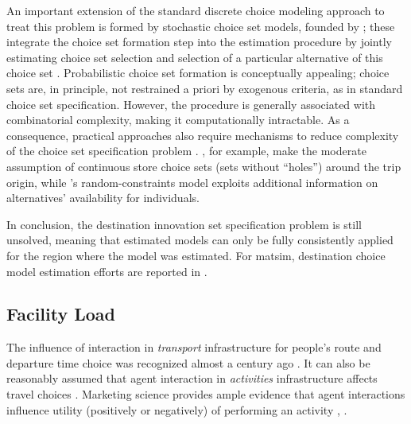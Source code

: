 An important extension of the standard discrete choice modeling approach to treat this problem is formed by stochastic choice set models, founded by \citet[][]{Manski_TD_1977, BurnettKPHanson_TRR_1979, BurnettKP_UG_1980}; these integrate the choice set formation step into the estimation procedure by jointly estimating  choice set selection and selection of a particular alternative of this choice set \citep[][]{Manski_TD_1977, BenAkivaBoccara_IJRM_1995}.
%
Probabilistic choice set formation is conceptually appealing; choice sets are, in principle, not restrained a priori by exogenous criteria, as in standard choice set specification. 
However, the procedure is generally associated with combinatorial complexity, making it computationally intractable. 
As a consequence, practical approaches also require mechanisms to reduce complexity of the choice set specification problem \citep[e.g.,][p.11]{BenAkivaBoccara_IJRM_1995}. 
\citet[][]{ZhengJieGuo_TRB_2008}, for example, make the moderate assumption of continuous store choice sets (\ie sets without ``holes'') around the trip origin, while \citet[][]{BenAkivaBoccara_IJRM_1995}'s random-constraints model exploits additional information on alternatives' availability for individuals.

In conclusion, the destination innovation set specification problem is still unsolved, meaning that estimated models can only be fully consistently applied for the region where the model was estimated. 
For \gls{matsim}, 
destination choice model estimation efforts are reported in \citet[][Chapter 5]{Horni_PhDThesis_2013}.

\subsection{Facility Load}
\label{sec:facilityload}
The influence of interaction in \emph{transport} infrastructure for people's route and departure time choice was recognized almost a century ago \citep[e.g.,][]{Pigou_1920, Knight_QJE_1924, Wardrop_PICE_1952}. 
It can also be reasonably assumed that agent interaction in \emph{activities} infrastructure affects travel choices \citep[][]{Axhausen_SSRL_2006}. 
Marketing science provides ample evidence that agent interactions influence utility (positively or negatively) of performing an activity \citep[][p.331]{BakerJEtAl_JAMS_1994}, \citep[][]{ErogluAndHarrell_JR_1986, ErogluAndMachleit_JR_1990, ErogluEtAl_JBR_2005, HarrellEtAl_JMR_1980, HuiAndBateson_JCR_1991, PonsEtAl_PsychMark_2006}.

